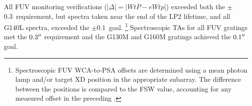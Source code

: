 \begin{description}
All FUV monitoring verifications ($|\Delta| = |WtP-eWtp|$) exceeded both the $\pm$0.3\arcsec\ requirement,
but spectra taken near the end of the LP2 lifetime, and all G140L spectra, exceeded the $\pm$0.1\arcsec\ goal.
\footnote{Spectroscopic FUV WCA-to-PSA offsets are determined using a mean photon lamp and/or target XD position in the appropriate subarray.
	The difference between the positions is compared to the FSW value, accounting for any measured offset in the preceding .}
	Spectroscopic TAs for all FUV gratings met the $0.3\hbox{$^{\prime\prime}$}$ requirement and the G130M and G160M gratings achieved the $0.1\hbox{$^{\prime\prime}$}$ goal.
\end{description}
